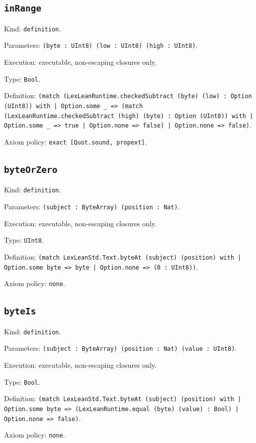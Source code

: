 \documentclass[11pt]{article}
\begin{document}
\subsection*{\texttt{inRange}}
\noindent Kind: \texttt{definition}.\par
\noindent Parameters: \texttt{(byte : UInt8) (low : UInt8) (high : UInt8)}.\par
\noindent Execution: executable, non-escaping closures only.\par
\noindent Type: \texttt{Bool}.\par
\noindent Definition: \texttt{(match (LexLeanRuntime.checkedSubtract (byte) (low) : Option (UInt8)) with | Option.some \_ => (match (LexLeanRuntime.checkedSubtract (high) (byte) : Option (UInt8)) with | Option.some \_ => true | Option.none => false) | Option.none => false)}.\par
\noindent Axiom policy: \texttt{exact [Quot.sound, propext]}.\par
\subsection*{\texttt{byteOrZero}}
\noindent Kind: \texttt{definition}.\par
\noindent Parameters: \texttt{(subject : ByteArray) (position : Nat)}.\par
\noindent Execution: executable, non-escaping closures only.\par
\noindent Type: \texttt{UInt8}.\par
\noindent Definition: \texttt{(match LexLeanStd.Text.byteAt (subject) (position) with | Option.some byte => byte | Option.none => (0 : UInt8))}.\par
\noindent Axiom policy: \texttt{none}.\par
\subsection*{\texttt{byteIs}}
\noindent Kind: \texttt{definition}.\par
\noindent Parameters: \texttt{(subject : ByteArray) (position : Nat) (value : UInt8)}.\par
\noindent Execution: executable, non-escaping closures only.\par
\noindent Type: \texttt{Bool}.\par
\noindent Definition: \texttt{(match LexLeanStd.Text.byteAt (subject) (position) with | Option.some byte => (LexLeanRuntime.equal (byte) (value) : Bool) | Option.none => false)}.\par
\noindent Axiom policy: \texttt{none}.\par
\end{document}
